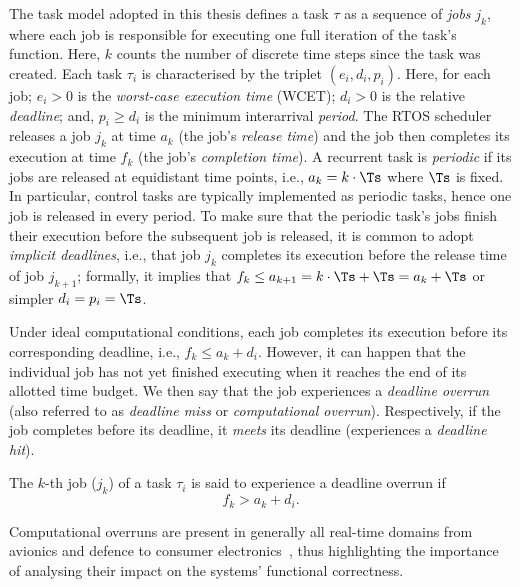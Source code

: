 The task model adopted in this thesis defines a task $\tau$ as a sequence of \emph{jobs} $j_k$, where each job is responsible for executing one full iteration of the task's function.
Here, $k$ counts the number of discrete time steps since the task was created.
Each task $\tau_i$ is characterised by the triplet $(e_i, d_i, p_i)$.
Here, for each job; $e_i > 0$ is the \emph{worst-case execution time} (WCET); $d_i > 0$ is the relative \emph{deadline}; and, $p_i \geq d_i$ is the minimum interarrival \emph{period}.
The RTOS scheduler releases a job $j_k$ at time $a_k$ (the job's \emph{release time}) and the job then completes its execution at time $f_k$ (the job's \emph{completion time}).
A recurrent task is \emph{periodic} if its jobs are released at equidistant time points, i.e., $a_k = k\cdot \Ts$ where $\Ts$ is fixed. 
In particular, control tasks are typically implemented as periodic tasks, hence one job is released in every period.
To make sure that the periodic task's jobs finish their execution before the subsequent job is released, it is common to adopt \emph{implicit deadlines}, i.e., that job $j_k$ completes its execution before the release time of job $j_{k+1}$; formally, it implies that $f_k \leq a_{k+1} = k\cdot \Ts+\Ts = a_k + \Ts$ or simpler $d_i = p_i = \Ts$.

Under ideal computational conditions, each job completes its execution before its corresponding deadline, i.e., $f_k \leq a_k + d_i$.
However, it can happen that the individual job has not yet finished executing when it reaches the end of its allotted time budget.
We then say that the job experiences a \emph{deadline overrun} (also referred to as \emph{deadline miss} or \emph{computational overrun}).
Respectively, if the job completes before its deadline, it \emph{meets} its deadline (experiences a \emph{deadline hit}).
%
\begin{definition}%
    \label{def:kappa:overrun}%
    The $k$-th job ($j_k$) of a task $\tau_i$ is said to experience a deadline overrun if
    \begin{equation*}
        f_k > a_k + d_i.
    \end{equation*}
\end{definition}
%
Computational overruns are present in generally all real-time domains from avionics and defence to consumer electronics~\cite{Akesson:2020}, thus highlighting the importance of analysing their impact on the systems' functional correctness.


